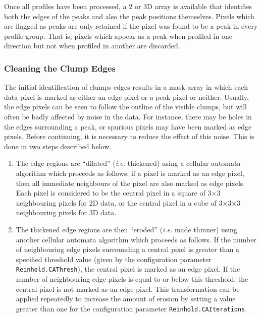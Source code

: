 \documentclass[twoside,11pt]{starlink}
\begin{document}
Once all profiles have been processed, a 2 or 3D array is available that
identifies both the edges of the peaks and also the peak positions
themselves. Pixels which are flagged as peaks are only retained if the
pixel was found to be a peak in every profile group. That is, pixels
which appear as a peak when profiled in one direction but not when
profiled in another are discarded.

\subsubsection{Cleaning the Clump Edges}
The initial identification of clumps edges results in a mask array in
which each data pixel is marked as either an edge pixel or a peak pixel
or neither. Usually, the edge pixels can be seen to follow the outline of
the visible clumps, but will often be badly affected by noise in the
data. For instance, there may be holes in the edges surrounding a peak,
or spurious pixels may have been marked as edge pixels. Before
continuing, it is necessary to reduce the effect of this noise. This is
done in two steps described below.

\begin{enumerate}
\item The edge regions are ``dilated'' (\emph{i.e.} thickened) using a
cellular automata algorithm which proceeds as follows: if a pixel is
marked as an edge pixel, then all immediate neighbours of the pixel are
also marked as edge pixels. Each pixel is considered to be the central
pixel in a square of 3$\times$3 neighbouring pixels for 2D data, or the central
pixel in a cube of 3$\times$3$\times$3 neighbouring pixels for 3D data.

\item The thickened edge regions are then ``eroded'' (\emph{i.e.} made
thinner) using another cellular automata algorithm which proceeds as follows.
If the number of neighbouring edge pixels surrounding a central pixel is
greater than a specified threshold value (given by the configuration
parameter \texttt{Reinhold.CAThresh}), the central pixel is marked as
an edge pixel. If the number of neighbouring edge pixels is equal to or
below this threshold, the central pixel is not marked as an edge pixel.
This transformation can be applied repeatedly to increase the amount of
erosion by setting a value greater than one for the configuration parameter
\texttt{Reinhold.CAIterations}.

\end{enumerate}
\end{document}
